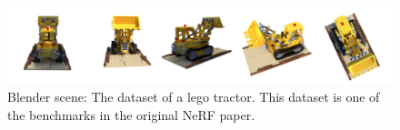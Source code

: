 \begin{figure}[h]
    \label{fig:lego-dataset}
    \centering
    \includegraphics[width=1.0\textwidth]{figures/lego-dataset.png}
    \caption{Blender scene: The dataset of a lego tractor. This dataset is one of the benchmarks in the original NeRF paper.}
    \label{fig:my_label}
\end{figure}